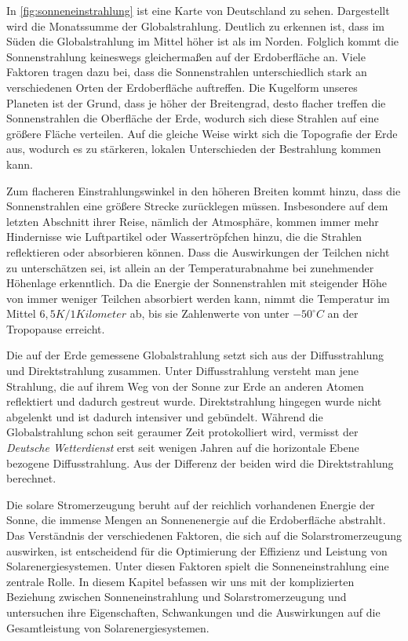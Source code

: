 \documentclass[12pt, a4paper]{article}
\begin{document}
In \autoref{fig:sonneneinstrahlung} ist eine Karte von Deutschland zu sehen. Dargestellt wird die Monatssumme der Globalstrahlung. Deutlich zu erkennen ist, dass im Süden die Globalstrahlung im Mittel höher ist als im Norden. Folglich kommt die Sonnenstrahlung keineswegs gleichermaßen auf der Erdoberfläche an. Viele Faktoren tragen dazu bei, dass die Sonnenstrahlen unterschiedlich stark an verschiedenen Orten der Erdoberfläche auftreffen. Die Kugelform unseres Planeten ist der Grund, dass je höher der Breitengrad, desto flacher treffen die Sonnenstrahlen die Oberfläche der Erde, wodurch sich diese Strahlen auf eine größere Fläche verteilen. Auf die gleiche Weise wirkt sich die Topografie der Erde aus, wodurch es zu stärkeren, lokalen Unterschieden der Bestrahlung kommen kann.

Zum flacheren Einstrahlungswinkel in den höheren Breiten kommt hinzu, dass die Sonnenstrahlen eine größere Strecke zurücklegen müssen. Insbesondere auf dem letzten Abschnitt ihrer Reise, nämlich der Atmosphäre, kommen immer mehr Hindernisse wie Luftpartikel oder Wassertröpfchen hinzu, die die Strahlen reflektieren oder absorbieren können. Dass die Auswirkungen der Teilchen nicht zu unterschätzen sei, ist allein an der Temperaturabnahme bei zunehmender Höhenlage erkenntlich. Da die Energie der Sonnenstrahlen mit steigender Höhe von immer weniger Teilchen absorbiert werden kann, nimmt die Temperatur im Mittel $6,5 K/ 1 Kilometer$  ab, bis sie Zahlenwerte von unter $-50 ^\circ C$ an der Tropopause erreicht.


Die auf der Erde gemessene Globalstrahlung setzt sich aus der Diffusstrahlung und Direktstrahlung zusammen. Unter Diffusstrahlung versteht man jene Strahlung, die auf ihrem Weg von der Sonne zur Erde an anderen Atomen reflektiert und dadurch gestreut wurde. Direktstrahlung hingegen wurde nicht abgelenkt und ist dadurch intensiver und gebündelt. Während die Globalstrahlung schon seit geraumer Zeit protokolliert wird,  vermisst der \textit{Deutsche Wetterdienst} erst seit wenigen Jahren auf die horizontale Ebene bezogene Diffusstrahlung. Aus der Differenz der beiden wird die Direktstrahlung berechnet. 





Die solare Stromerzeugung beruht auf der reichlich vorhandenen Energie der Sonne, die immense Mengen an Sonnenenergie auf die Erdoberfläche abstrahlt. Das Verständnis der verschiedenen Faktoren, die sich auf die Solarstromerzeugung auswirken, ist entscheidend für die Optimierung der Effizienz und Leistung von Solarenergiesystemen. Unter diesen Faktoren spielt die Sonneneinstrahlung eine zentrale Rolle. In diesem Kapitel befassen wir uns mit der komplizierten Beziehung zwischen Sonneneinstrahlung und Solarstromerzeugung und untersuchen ihre Eigenschaften, Schwankungen und die Auswirkungen auf die Gesamtleistung von Solarenergiesystemen.
\end{document}
